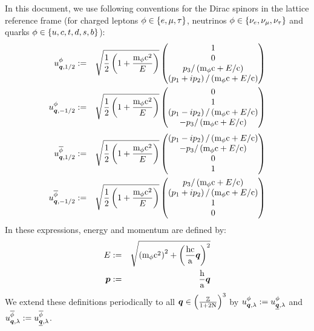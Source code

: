 \documentclass[10pt,a4paper,twoside,openany]{book}
\begin{document}
In this document, we use following conventions for the Dirac spinors in the lattice reference frame (for charged leptons $\phi \in \{ e, \mu, \tau \}$, neutrinos $\phi \in \{ \nu_{e}, \nu_{\mu}, \nu_{\tau} \}$ and quarks $\phi \in \{ u, c, t, d, s, b \}$):
\begin{eqnarray*}
u^{\phi}_{{\boldsymbol{q}}, {1/2}} & := & \sqrt{\frac 1 2 \left( 1 + \frac {\mathrm m_{\phi} \mathrm c^2} E \right)} \begin{pmatrix} 1 \\ 0 \\ p_3 / \left( \mathrm m_{\phi} \mathrm c + E / \mathrm c \right) \\ \left( p_1 + i p_2 \right) / \left( \mathrm m_{\phi} \mathrm c + E / \mathrm c \right) \end{pmatrix} \\
u^{\phi}_{{\boldsymbol{q}}, {-1/2}} & := & \sqrt{\frac 1 2 \left( 1 + \frac {\mathrm m_{\phi} \mathrm c^2} E \right)} \begin{pmatrix} 0 \\ 1 \\ \left( p_1 - i p_2 \right) / \left( \mathrm m_{\phi} \mathrm c + E / \mathrm c \right) \\ -p_3 / \left( \mathrm m_{\phi} \mathrm c + E / \mathrm c \right) \end{pmatrix}
\end{eqnarray*}
\begin{eqnarray*}
u^{\overline{\phi}}_{{\boldsymbol{q}}, {1/2}} & := & \sqrt{\frac 1 2 \left( 1 + \frac {\mathrm m_{\phi} \mathrm c^2} E \right)} \begin{pmatrix} \left( p_1 - i p_2 \right) / \left( \mathrm m_{\phi} \mathrm c + E / \mathrm c \right) \\ -p_3 / \left( \mathrm m_{\phi} \mathrm c + E / \mathrm c \right) \\ 0 \\ 1 \end{pmatrix} \\
u^{\overline{\phi}}_{{\boldsymbol{q}}, {-1/2}} & := & \sqrt{\frac 1 2 \left( 1 + \frac {\mathrm m_{\phi} \mathrm c^2} E \right)} \begin{pmatrix}  p_3 / \left( \mathrm m_{\phi} \mathrm c + E / \mathrm c \right) \\ \left( p_1 + i p_2 \right) / \left( \mathrm m_{\phi} \mathrm c + E / \mathrm c \right) \\ 1 \\ 0 \end{pmatrix}
\end{eqnarray*}
In these expressions, energy and momentum are defined by:
\begin{eqnarray*}
E & := & \sqrt{\left( \mathrm m_{\phi} \mathrm c^2 \right)^2 + \left( \frac{\mathrm h \mathrm c}{\mathrm a} \boldsymbol{q} \right)^2} \\
\boldsymbol{p} & := & \frac {\mathrm h} {\mathrm a} \boldsymbol{q} 
\end{eqnarray*}
We extend these definitions periodically to all $\boldsymbol{q} \in \left( \frac{\mathbb{Z}}{1 + 2 \mathrm N} \right)^3$ by $u^{\phi}_{{\boldsymbol{q}}, {\lambda}} := u^{\phi}_{{\underline{\boldsymbol{q}}}, {\lambda}}$ and $u^{\overline{\phi}}_{{\boldsymbol{q}}, {\lambda}} := u^{\overline{\phi}}_{{\underline{\boldsymbol{q}}}, {\lambda}}$.
\end{document}
